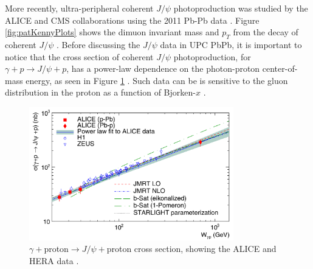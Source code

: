 More recently, ultra-peripheral coherent $J/\psi$ photoproduction was studied by the ALICE and CMS collaborations using the 2011 Pb-Pb data \cite{Abelev:2012ba}. Figure \ref{fig:patKennyPlots} shows the dimuon invariant mass and $p_T$ from the decay of coherent $J/\psi$ \cite{Khachatryan:2016qhq}. Before discussing the $J/\psi$ data in UPC PbPb, it is important to notice that the cross section of coherent $J/\psi$ photoproduction, for $\gamma+p\rightarrow J/\psi+p$, has a power-law dependence on the photon-proton center-of-mass energy, as seen in Figure \ref{fig:aliceData1} \cite{Klein:2017nqo}. Such data can be is sensitive to the gluon distribution in the proton as a function of Bjorken-$x$ \cite{pQCD2011.08}.

\begin{figure}[h!]
\begin{centering}
\includegraphics[width=3.5in]{Chapter2/importfigs/alice_jpsi_data.png}
\par\end{centering}
\caption{$\gamma +$proton$\rightarrow J/\psi +$proton cross section, showing the ALICE and HERA data \cite{TheALICE:2014dwa}. \label{fig:aliceData1}}
\end{figure}

